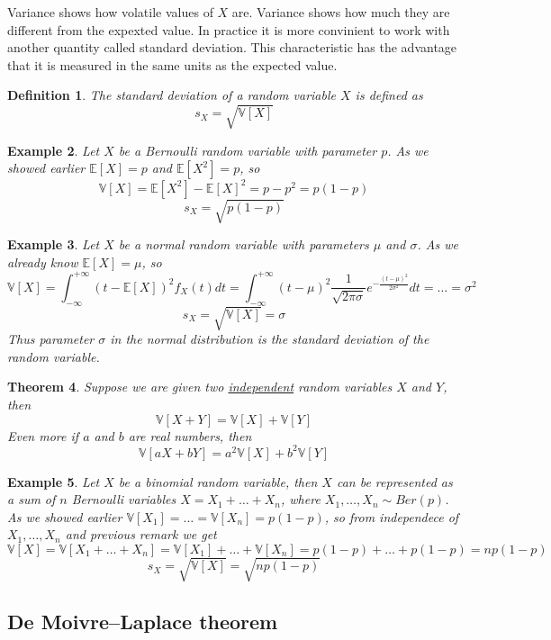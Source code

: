 \documentclass[12pt]{article}
\newtheorem{theorem}{Theorem}[subsection]
\newtheorem{definition}[theorem]{Definition}
\newtheorem{example}[theorem]{Example}
\begin{document}
Variance shows how volatile values of $X$ are. Variance shows how much they are different from the expexted value. In practice it is more convinient to work with another quantity called standard deviation. This characteristic has the advantage that it is measured in the same units as the expected value.  

\begin{definition} The standard deviation of a random variable $X$ is defined as 
$$
s_X=\sqrt{\mathbb{V}[X]}
$$
\end{definition}

\begin{example} Let $X$ be a Bernoulli random variable with parameter $p$. As we showed earlier $\mathbb{E}[X]=p$ and $\mathbb{E}[X^2]=p$, so
$$
\mathbb{V}[X]=\mathbb{E}[X^2]-\mathbb{E}[X]^2=p-p^2=p(1-p)
$$
$$
s_X=\sqrt{p(1-p)}
$$
\end{example}

\begin{example} Let $X$ be a normal random variable with parameters $\mu$ and $\sigma$. As we already know $\mathbb{E}[X]=\mu$, so
$$
\mathbb{V}[X]
=\int_{-\infty}^{+\infty}(t-\mathbb{E}[X])^2 f_X(t)dt
=\int_{-\infty}^{+\infty}(t-\mu)^2 \frac{1}{\sqrt{2\pi\sigma}}e^{-\frac{(t-\mu)^2}{2\sigma^2}}dt=\ldots=\sigma^2
$$
$$
s_X=\sqrt{\mathbb{V}[X]}=\sigma
$$
Thus parameter $\sigma$ in the normal distribution is the standard deviation of the random variable.
\end{example}

\begin{theorem} Suppose we are given two \underline{independent} random variables $X$ and $Y$, then
$$
\mathbb{V}[X+Y]=\mathbb{V}[X]+\mathbb{V}[Y]
$$
Even more if $a$ and $b$ are real numbers, then
$$
\mathbb{V}[aX+bY]=a^2\mathbb{V}[X]+b^2\mathbb{V}[Y]
$$
\end{theorem}


\begin{example} Let $X$ be a binomial random variable, then $X$ can be represented as a sum of $n$ Bernoulli variables
$X=X_1+\ldots+X_n$, where $X_1,\ldots,X_n\sim Ber(p)$. As we showed earlier $\mathbb{V}[X_1]=\ldots=\mathbb{V}[X_n]=p(1-p)$, so from independece of $X_1,\ldots, X_n$ and previous remark we get
$$
\mathbb{V}[X]=\mathbb{V}[X_1+\ldots+X_n]=\mathbb{V}[X_1]+\ldots+\mathbb{V}[X_n]=p(1-p)+\ldots+p(1-p)=np(1-p)
$$
$$
s_X=\sqrt{\mathbb{V}[X]}=\sqrt{np(1-p)}
$$
\end{example}

\subsection{De Moivre–Laplace theorem}
\end{document}

